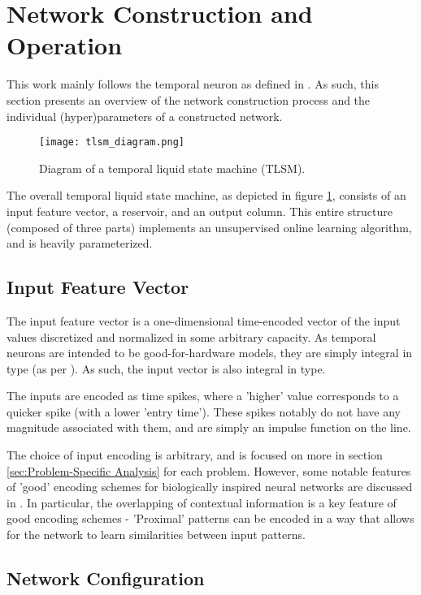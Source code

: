 \section{Network Construction and Operation}

This work mainly follows the temporal neuron as defined in \cite{TNN}. As such,
this section presents an overview of the network construction process and
the individual (hyper)parameters of a constructed network.

\begin{figure}[h]
    \centering
    \texttt{[image: tlsm\_diagram.png]}
    \caption{Diagram of a temporal liquid state machine (TLSM).}
    \label{fig:tlsm_diagram}
\end{figure}

The overall temporal liquid state machine, as depicted in figure
\ref{fig:tlsm_diagram}, consists of an input feature vector, a reservoir, and an
output column. This entire structure (composed of three parts) implements an
unsupervised online learning algorithm, and is heavily parameterized.

\subsection{Input Feature Vector}

The input feature vector is a one-dimensional time-encoded vector of the input
values discretized and normalized in some arbitrary capacity. As temporal
neurons are intended to be good-for-hardware models, they are simply integral
in type (as per \cite{TNN}). As such, the input vector is also integral in type.

The inputs are encoded as time spikes, where a 'higher' value corresponds to a
quicker spike (with a lower 'entry time'). These spikes notably do not have any
magnitude associated with them, and are simply an impulse function on the line.

The choice of input encoding is arbitrary, and is focused on more in section
\ref{sec:Problem-Specific Analysis} for each problem. However, some notable
features of 'good' encoding schemes for biologically inspired neural networks
are discussed in \cite{Encoding}. In particular, the overlapping of contextual
information is a key feature of good encoding schemes - 'Proximal' patterns can
be encoded in a way that allows for the network to learn similarities between
input patterns.

\subsection{Network Configuration}

